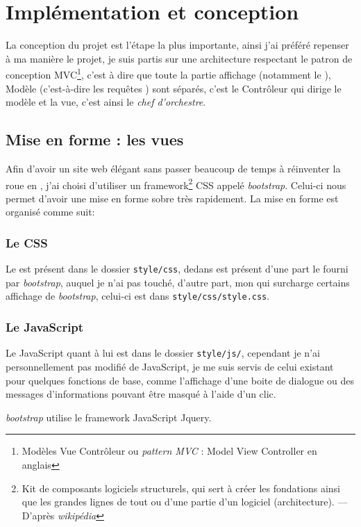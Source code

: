\documentclass[12pt,a4paper,openany]{book}
\newcommand{\bootstrap}{\textit{bootstrap}}
\begin{document}
	\chapter{Implémentation et conception}
		La conception du projet est l'étape la plus importante, ainsi j'ai préféré repenser à ma manière le projet, 
		je suis partis sur une architecture respectant le patron de conception MVC\footnote{Modèles Vue Contrôleur ou
		\textit{pattern MVC} : Model View Controller en anglais}, c'est à
		dire que toute la partie affichage (notamment le ), Modèle (c'est-à-dire les requêtes ) sont séparés, 
		c'est le Contrôleur qui dirige le modèle et la vue, c'est ainsi le \textit{chef d'orchestre}.
		\section{Mise en forme : les vues}
			Afin d'avoir un site web élégant sans passer beaucoup de temps à réinventer la roue en , j'ai choisi d'utiliser un
			framework\footnote{Kit de composants logiciels structurels, qui sert à créer les fondations ainsi que les grandes lignes de tout ou d’une partie d'un
			logiciel (architecture). --- D'après \textit{wikipédia}} CSS
			appelé \bootstrap{}. Celui-ci nous permet d'avoir une mise en forme sobre très rapidement.  La mise en forme est organisé comme suit:

			\subsection{Le CSS} Le  est présent dans le dossier \texttt{style/css}, dedans est présent d'une part le
			 fourni par \bootstrap{}, auquel je n'ai pas touché, d'autre part, mon  qui surcharge certains affichage de \bootstrap{}, celui-ci est dans \texttt{style/css/style.css}.
			
			\subsection{Le JavaScript}
			Le JavaScript quant à lui est dans le dossier \texttt{style/js/}, cependant je n'ai personnellement pas modifié de
			JavaScript, je me suis servis de celui existant pour quelques fonctions de base, comme l'affichage d'une boite de
			dialogue ou des messages d'informations pouvant être masqué à l'aide d'un clic.

			\bootstrap{} utilise le framework JavaScript Jquery.
				
\end{document}
